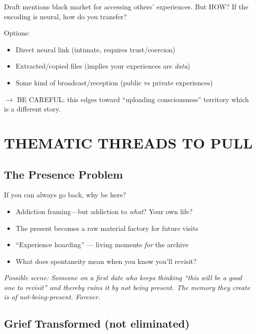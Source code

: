 \documentclass[11pt,letterpaper]{article}
\begin{document}
\begin{enumerate}[leftmargin=*]
    Draft mentions black market for accessing others' experiences. But HOW? If the encoding is neural, how do you transfer? 
    
    Options:
    \begin{itemize}
        \item Direct neural link (intimate, requires trust/coercion)
        \item Extracted/copied files (implies your experiences are \textit{data})
        \item Some kind of broadcast/reception (public vs private experiences)
    \end{itemize}
    
    \textcolor{warnorange}{$\rightarrow$ BE CAREFUL: this edges toward ``uploading consciousness'' territory which is a different story.}
\end{enumerate}

\vspace{1em}

\section*{THEMATIC THREADS TO PULL}

\subsection*{The Presence Problem}

If you can always go back, why be here?

\begin{itemize}[leftmargin=*]
    \item Addiction framing---but addiction to \textit{what}? Your own life?
    \item The present becomes a raw material factory for future visits
    \item ``Experience hoarding'' --- living moments \textit{for} the archive
    \item What does spontaneity mean when you know you'll revisit?
\end{itemize}

\textit{Possible scene: Someone on a first date who keeps thinking ``this will be a good one to revisit'' and thereby ruins it by not being present. The memory they create is of not-being-present. Forever.}

\subsection*{Grief Transformed (not eliminated)}
\end{document}
